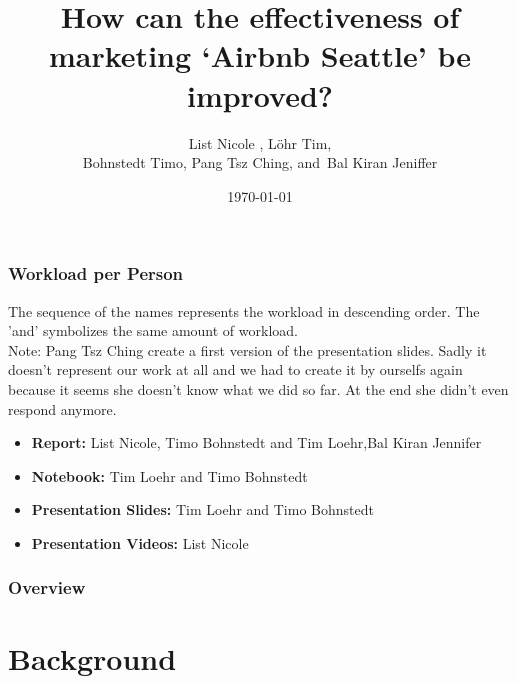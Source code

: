 \documentclass{beamer}
\title[Improve Airbnb's marketing]{How can the effectiveness of marketing ‘Airbnb Seattle’ be improved?} %
\author{List Nicole ,
      L\"ohr Tim,\\
      Bohnstedt Timo,
      Pang Tsz Ching,
      and~Bal Kiran Jeniffer%
      }
\institute[Information Systems] %
{
City University of Hong Kong\\ %
\medskip
\textit{Project Presentation
Machine Learning for Business IS4861 } 
}
\date{\today} %
\begin{document}
\begin{frame}
\frametitle{Workload per Person}
The sequence of the names represents the workload in descending order. The 'and' symbolizes the same amount of workload.\\Note: Pang Tsz Ching create a first version of the presentation slides. Sadly it doesn't represent our work at all and we had to create it by ourselfs again because it seems she doesn't know what we did so far. At the end she didn't even respond anymore. 
\begin{itemize}
\item \textbf{Report:} List Nicole, Timo Bohnstedt and Tim Loehr,Bal Kiran Jennifer 
\item \textbf{Notebook:} Tim Loehr and Timo Bohnstedt
\item \textbf{Presentation Slides:} Tim Loehr and Timo Bohnstedt
\item \textbf{Presentation Videos:} List Nicole
\end{itemize}
\end{frame}

\begin{frame}
\titlepage %
\end{frame}
\begin{frame}
\frametitle{Overview} %
\tableofcontents %
\end{frame}
%

\section{Background}
\end{document}
